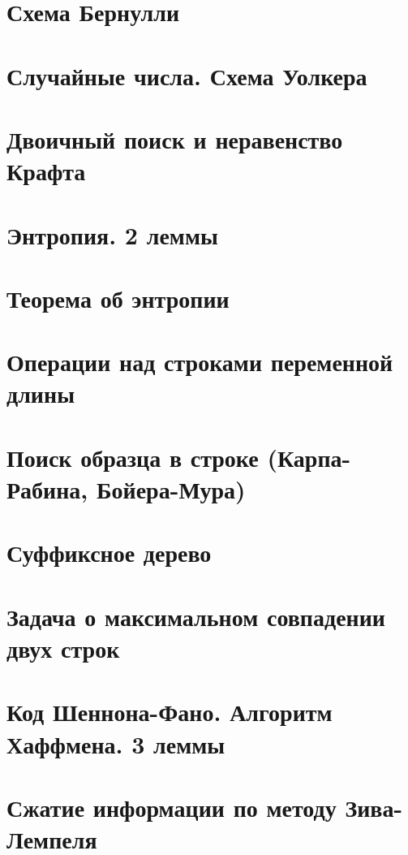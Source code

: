\documentclass[12pt, fleqn]{article}
\begin{document}
\section{Схема Бернулли}


\section{Случайные числа. Схема Уолкера}


\section{Двоичный поиск и неравенство Крафта}


\section{Энтропия. 2 леммы}


\section{Теорема об энтропии}


\section{Операции над строками переменной длины}


\section{Поиск образца в строке (Карпа-Рабина, Бойера-Мура)}


\section{Суффиксное дерево}


\section{Задача о максимальном совпадении двух строк}


\section{Код Шеннона-Фано. Алгоритм Хаффмена. 3 леммы}


\section{Сжатие информации по методу Зива-Лемпеля}
\end{document}
